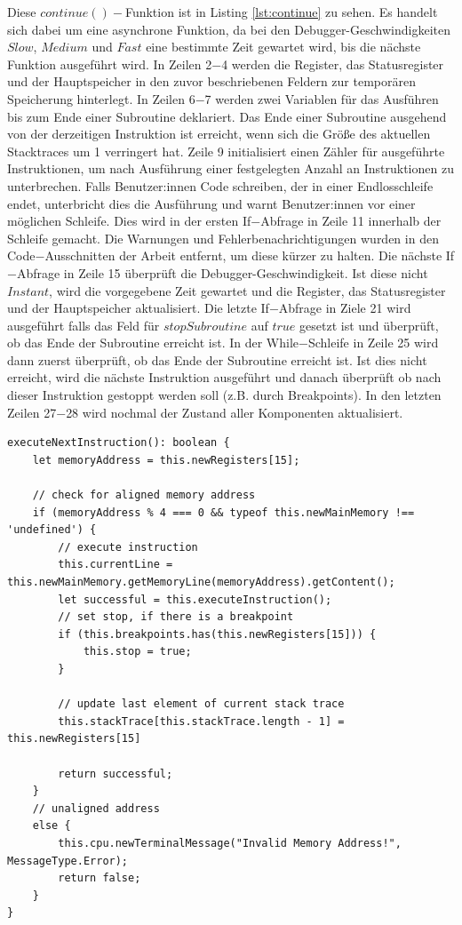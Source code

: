 \documentclass[a4paper, 11pt, onecolumn]{article}
\begin{document}
Diese $continue()-$Funktion ist in Listing \ref{lst:continue} zu sehen. Es handelt sich dabei um eine asynchrone Funktion, da bei den Debugger-Geschwindigkeiten $Slow$, $Medium$ und $Fast$ eine bestimmte Zeit gewartet wird, bis die nächste Funktion ausgeführt wird. In Zeilen 2$-$4 werden die Register, das Statusregister und der Hauptspeicher in den zuvor beschriebenen Feldern zur temporären Speicherung hinterlegt. In Zeilen 6$-$7 werden zwei Variablen für das Ausführen bis zum Ende einer Subroutine deklariert. Das Ende einer Subroutine ausgehend von der derzeitigen Instruktion ist erreicht, wenn sich die Größe des aktuellen Stacktraces um 1 verringert hat. Zeile 9 initialisiert einen Zähler für ausgeführte Instruktionen, um nach Ausführung einer festgelegten Anzahl an Instruktionen zu unterbrechen. Falls Benutzer:innen Code schreiben, der in einer Endlosschleife endet, unterbricht dies die Ausführung und warnt Benutzer:innen vor einer möglichen Schleife. Dies wird in der ersten If$-$Abfrage in Zeile 11 innerhalb der Schleife gemacht. Die Warnungen und Fehlerbenachrichtigungen wurden in den Code$-$Ausschnitten der Arbeit entfernt, um diese kürzer zu halten. Die nächste If$-$Abfrage in Zeile 15 überprüft die Debugger-Geschwindigkeit. Ist diese nicht $Instant$, wird die vorgegebene Zeit gewartet und die Register, das Statusregister und der Hauptspeicher aktualisiert. Die letzte If$-$Abfrage in Ziele 21 wird ausgeführt falls das Feld für $stopSubroutine$ auf $true$ gesetzt ist und überprüft, ob das Ende der Subroutine erreicht ist. In der While$-$Schleife in Zeile 25 wird dann zuerst überprüft, ob das Ende der Subroutine erreicht ist. Ist dies nicht erreicht, wird die nächste Instruktion ausgeführt und danach überprüft ob nach dieser Instruktion gestoppt werden soll (z.B. durch Breakpoints). In den letzten Zeilen 27$-$28 wird nochmal der Zustand aller Komponenten aktualisiert.

\begin{lstlisting}[style=JavaScript, basicstyle=\footnotesize, backgroundcolor=\color{backcolour}, caption={Funktion zum Ausführen der nächsten Instruktion}, captionpos=b, label={lst:execNext},float,floatplacement=H]
executeNextInstruction(): boolean {
    let memoryAddress = this.newRegisters[15];

    // check for aligned memory address
    if (memoryAddress % 4 === 0 && typeof this.newMainMemory !== 'undefined') {
        // execute instruction
        this.currentLine = this.newMainMemory.getMemoryLine(memoryAddress).getContent();
        let successful = this.executeInstruction();
        // set stop, if there is a breakpoint
        if (this.breakpoints.has(this.newRegisters[15])) {
            this.stop = true;
        }

        // update last element of current stack trace
        this.stackTrace[this.stackTrace.length - 1] = this.newRegisters[15]

        return successful;
    }
    // unaligned address
    else {
        this.cpu.newTerminalMessage("Invalid Memory Address!", MessageType.Error);
        return false;
    }
}   	
\end{lstlisting}
\end{document}
